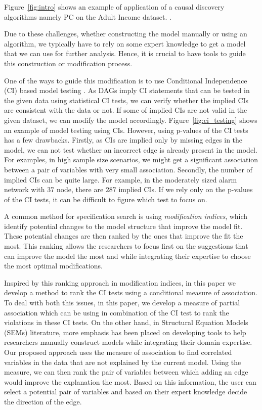 \documentclass[letterpaper]{article} %
\begin{document}
Figure~\ref{fig:intro} shows an example of application of a causal discovery
algorithms namely PC on the Adult Income dataset. .

Due to these challenges, whether constructing the model manually or using an
algorithm, we typically have to rely on some expert knowledge to get a model
that we can use for further analysis. Hence, it is crucial to have tools to
guide this construction or modification process.

One of the ways to guide this modification is to use Conditional Independence
(CI) based model testing \cite{Ankan2023}. As DAGs imply CI statements that can
be tested in the given data using statistical CI tests, we can verify whether
the implied CIs are consistent with the data or not. If some of implied CIs are
not valid in the given dataset, we can modify the model accordingly.
Figure~\ref{fig:ci_testing} shows an example of model testing using CIs.
However, using p-values of the CI tests has a few drawbacks. Firstly, as CIs
are implied only by missing edges in the model, we can not test whether an
incorrect edge is already present in the model. For examples, in high sample
size scenarios, we might get a significant association between a pair of
variables with very small association. Secondly, the number of implied CIs can
be quite large. For example, in the moderately sized alarm network with $ 37 $
node, there are $287$ implied CIs. If we rely only on the p-values of the CI
tests, it can be difficult to figure which test to focus on.

A common method for specification search is using \emph{modification indices},
which identify potential changes to the model structure that improve the model
fit. These potential changes are then ranked by the ones that improve the fit
the most. This ranking allows the researchers to focus first on the suggestions
that can improve the model the most and while integrating their expertise to
choose the most optimal modifications. 

Inspired by this ranking approach in modification indices, in this paper we
develop a method to rank the CI tests using a conditional measure of
association.  To deal with both this issues, in this paper, we develop a
measure of partial association which can be using in combination of the CI test
to rank the violations in these CI tests. On the other hand, in Structural
Equation Models (SEMs) literature, more emphasis has been placed on developing
tools to help researchers manually construct models while integrating their
domain expertise. Our proposed approach uses the measure of association to find
correlated variables in the data that are not explained by the current model.
Using the measure, we can then rank the pair of variables between which adding
an edge would improve the explanation the most. Based on this information, the
user can select a potential pair of variables and based on their expert
knowledge decide the direction of the edge. 
\end{document}
